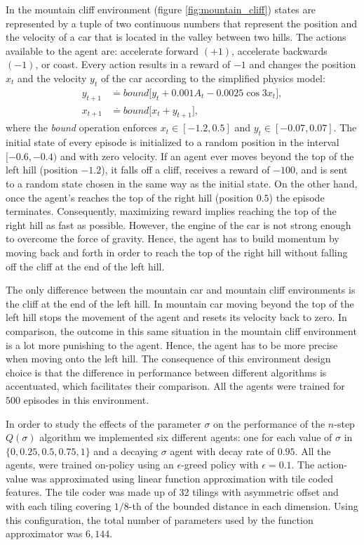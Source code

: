 In the mountain cliff environment (figure \ref{fig:mountain_cliff}) states are represented by a tuple of two continuous numbers that represent the position and the velocity of a car that is located in the valley between two hills.
The actions available to the agent are: accelerate forward $(+1)$, accelerate backwards $(-1)$, or coast.
Every action results in a reward of $-1$ and changes the position $x_t$ and the velocity $y_t$ of the car according to the simplified physics model:
\begin{align}
\label{eq:mountain_cliff_phys}
    y_{t+1} & \overset{.}{=} \textit{bound}\big[ y_t  + 0.001 A_t - 0.0025 \cos{3 x_t}  \big],
    \nonumber \\
    x_{t+1} & \overset{.}{=} \textit{bound}\big[ x_t + y_{t+1} \big],
\end{align}
%
where the \textit{bound} operation enforces $x_{t} \in [-1.2, 0.5]$ and $y_t \in [-0.07, 0.07]$.
The initial state of every episode is initialized to a random position in the interval $[-0.6, -0.4)$ and with zero velocity.
If an agent ever moves beyond the top of the left hill (position $-1.2$), it falls off a cliff, receives a reward of $-100$, and is sent to a random state chosen in the same way as the initial state.
On the other hand, once the agent's reaches the top of the right hill (position $0.5$) the episode terminates.
Consequently, maximizing reward implies reaching the top of the right hill as fast as possible.
However, the engine of the car is not strong enough to overcome the force of gravity.
Hence, the agent has to build momentum by moving back and forth in order to reach the top of the right hill without falling off the cliff at the end of the left hill.

The only difference between the mountain car and mountain cliff environments is the cliff at the end of the left hill.
In mountain car moving beyond the top of the left hill stops the movement of the agent and resets its velocity back to zero.
In comparison, the outcome in this same situation in the mountain cliff environment is a lot more punishing to the agent. 
Hence, the agent has to be more precise when moving onto the left hill.
The consequence of this environment design choice is that the difference in performance between different algorithms is accentuated, which facilitates their comparison.
All the agents were trained for $500$ episodes in this environment.

In order to study the effects of the parameter $\sigma$ on the performance of the $n$-step $Q(\sigma)$ algorithm we implemented six different agents: one for each value of $\sigma$ in $\{ 0, 0.25, 0.5, 0.75, 1\}$ and a decaying $\sigma$ agent with decay rate of $0.95$.
All the agents, were trained on-policy using an $\epsilon$-greed policy with $\epsilon = 0.1$.
The action-value was approximated using linear function approximation with tile coded features.
The tile coder was made up of 32 tilings with asymmetric offset and with each tiling covering $1/8$-th of the bounded distance in each dimension.
Using this configuration, the total number of parameters used by the function approximator was $6,144$.

